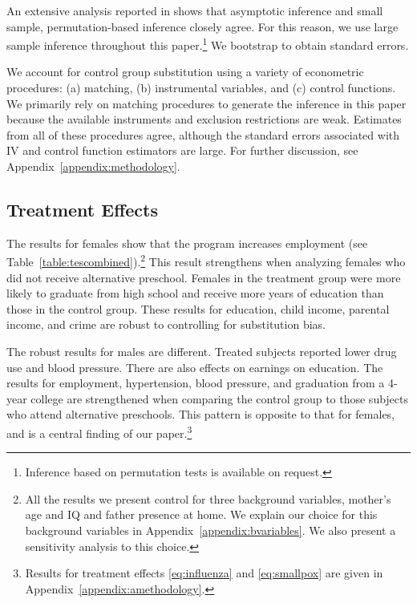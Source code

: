 An extensive analysis reported in \citet{Campbell_Conti_etal_2014_EarlyChildhoodInvestments} shows that asymptotic inference and small sample, permutation-based inference closely agree. For this reason, we use large sample inference throughout this paper.\footnote{Inference based on permutation tests is available on request.} We bootstrap to obtain standard errors.

We account for control group substitution using a variety of econometric procedures: (a) matching, (b) instrumental variables, and (c) control functions. We primarily rely on matching procedures to generate the inference in this paper because the available instruments and exclusion restrictions are weak. Estimates from all of these procedures agree, although the standard errors associated with IV and control function estimators are large. For further discussion, see Appendix~\ref{appendix:methodology}.

\subsection{Treatment Effects}

The results for females show that the program increases employment (see Table~\ref{table:tescombined}).\footnote{All the results we present control for three background variables, mother's age and IQ and father presence at home. We explain our choice for this background variables in Appendix~\ref{appendix:bvariables}. We also present a sensitivity analysis to this choice.} This result strengthens when analyzing females who did not receive alternative preschool. Females in the treatment group were more likely to graduate from high school and receive more years of education than those in the control group. These results for education, child income, parental income, and crime are robust to controlling for substitution bias.

The robust results for males are different. Treated subjects reported lower drug use and blood pressure. There are also effects on earnings on education. The results for employment, hypertension, blood pressure, and graduation from a 4-year college are strengthened when comparing the control group to those subjects who attend alternative preschools. This pattern is opposite to that for females, and is a central finding of our paper.\footnote{Results for treatment effects \eqref{eq:influenza} and \eqref{eq:smallpox} are given in Appendix~\ref{appendix:amethodology}.}

